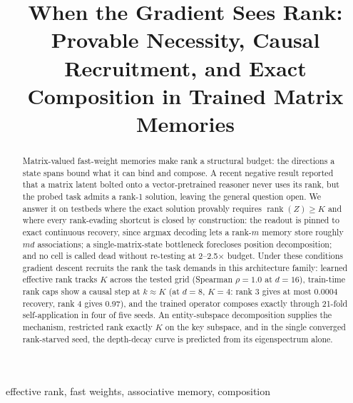 \documentclass[mlabstract,onecolumn]{jmlr}
\title[When the Gradient Sees Rank]{When the Gradient Sees Rank: Provable
Necessity, Causal Recruitment, and Exact Composition in Trained Matrix
Memories}
\newcommand{\rank}{\operatorname{rank}}
\begin{document}
\maketitle

\begin{abstract}
Matrix-valued fast-weight memories make rank a structural budget: the
directions a state spans bound what it can bind and compose. A recent
negative result reported that a matrix latent bolted onto a
vector-pretrained reasoner never uses its rank, but the probed task admits
a rank-1 solution, leaving the general question open. We answer it on
testbeds where the exact solution provably requires
$\rank(Z) \geq K$ and where every rank-evading shortcut is closed by
construction: the readout is pinned to exact continuous recovery, since
argmax decoding lets a rank-$m$ memory store roughly $md$ associations; a
single-matrix-state bottleneck forecloses position decomposition; and no
cell is called dead without re-testing at 2--2.5$\times$ budget. Under
these conditions gradient descent recruits the rank the task demands in
this architecture family:
learned effective rank tracks $K$ across the tested grid (Spearman
$\rho = 1.0$ at $d = 16$),
train-time rank caps show a causal step at $k \approx K$ (at $d = 8$,
$K = 4$: rank 3 gives at most 0.0004 recovery, rank 4 gives 0.97),
and the trained operator composes exactly through 21-fold self-application
in four of five seeds.
An entity-subspace decomposition supplies the mechanism, restricted rank
exactly $K$ on the key subspace,
and in the single converged rank-starved seed, the depth-decay curve is
predicted from its eigenspectrum alone.
\end{abstract}

\begin{keywords}
effective rank, fast weights, associative memory, composition
\end{keywords}










\end{document}
